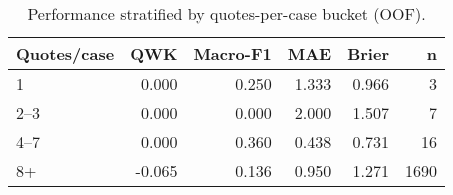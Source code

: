 \begin{table}
\caption{Performance stratified by quotes-per-case bucket (OOF).}
\label{tab:robustness-qpc}
\begin{tabular}{lrrrrr}
\toprule
Quotes/case & QWK & Macro-F1 & MAE & Brier & n \\
\midrule
1 & 0.000 & 0.250 & 1.333 & 0.966 & 3 \\
2–3 & 0.000 & 0.000 & 2.000 & 1.507 & 7 \\
4–7 & 0.000 & 0.360 & 0.438 & 0.731 & 16 \\
8+ & -0.065 & 0.136 & 0.950 & 1.271 & 1690 \\
\bottomrule
\end{tabular}
\end{table}
